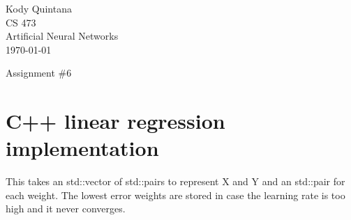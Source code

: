 \documentclass[14pt]{article}
\begin{document}
\begin{flushleft}
 
\large
Kody Quintana\\
CS 473\\
Artificial Neural Networks\\
\today\\
\boldmath

\begin{center}
Assignment \#6
\end{center}
\section{C++ linear regression implementation}
This takes an std::vector of std::pairs to represent X and Y and an std::pair for each weight.
The lowest error weights are stored in case the learning rate is too high and it never converges.
\end{flushleft}
\end{document}
